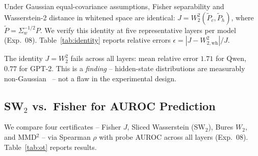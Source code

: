\documentclass[onecolumn]{jmlr}
\begin{document}
Under Gaussian equal-covariance assumptions, Fisher separability and
Wasserstein-2 distance in whitened space are identical:
$J = W_2^2\!\left(\tilde{P}_c, \tilde{P}_h\right)$, where $\tilde{P} =
\Sigma_w^{-1/2} P$.
We verify this identity at five representative layers per model
(Exp.~08). Table~\ref{tab:identity} reports relative errors
$\epsilon = |J - W_{2,\text{wh}}^2| / J$.

\begin{table}[!htbp]
\centering
\caption{Relative error of $J \approx W_2^2$ (whitened) identity at
  five layers per model (Exp.~08).  Identity never holds; error grows
  with depth for Qwen.}
\label{tab:identity}
\small
\setlength{\tabcolsep}{4pt}
\end{table}

The identity $J = W_2^2$ fails across all layers: mean relative error
$1.71$ for Qwen, $0.77$ for GPT-2. This is a \emph{finding} --
hidden-state distributions are measurably
non-Gaussian~\citep{disipio2025fisher} -- not a flaw in the
experimental design.

\subsection{\texorpdfstring{SW$_2$}{SW2} vs.\ Fisher for AUROC Prediction}
\label{sec:ot-sw2}

We compare four certificates -- Fisher $J$, Sliced Wasserstein
($\text{SW}_2$), Bures $W_2$, and MMD$^2$ -- via Spearman $\rho$ with
probe AUROC across all layers (Exp.~08). Table~\ref{tab:ot} reports results.

\begin{table}[!htbp]
\centering
\caption{Spearman $\rho$ between certificate value and probe AUROC across
  all layers (Exp.~08).  Higher is better.  Bures~$W_2$ and SW$_2$ both
  appeared to outperform Fisher on Qwen (best: Bures 0.828, bold) -- \emph{a reading withdrawn in \S\ref{sec:ot}};
  Fisher wins on GPT-2.  SW$_2$ and Bures~$W_2$ are distribution-free;
  the 0.007 gap between them is within noise.}
\label{tab:ot}
\small
\setlength{\tabcolsep}{4pt}
\end{table}
\end{document}
